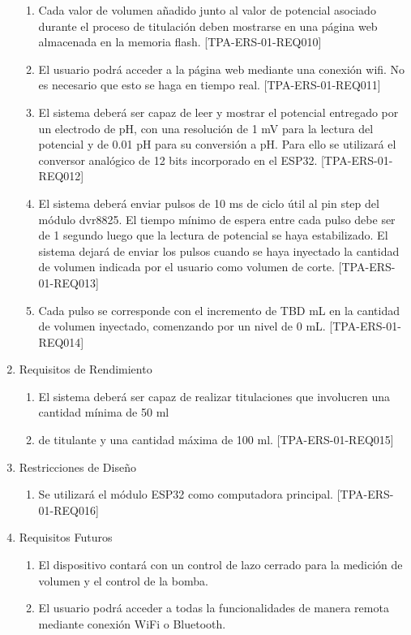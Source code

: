 \documentclass[11pt]{charter}
\begin{document}
\begin{enumerate}
\begin{enumerate}
	\item Cada valor de volumen añadido junto al valor de potencial asociado durante el proceso de titulación deben mostrarse en una página web almacenada en la memoria flash. [TPA-ERS-01-REQ010]
	\item El usuario podrá acceder a la página web mediante una conexión wifi. No es necesario que esto se haga en tiempo real. [TPA-ERS-01-REQ011]
	\item El sistema deberá ser capaz de leer y mostrar el potencial entregado por un electrodo de pH, con una resolución de 1 mV para la lectura del potencial y de 0.01 pH para su conversión a pH. Para ello se utilizará el conversor analógico de 12 bits incorporado en el ESP32. [TPA-ERS-01-REQ012]
	\item El sistema deberá enviar pulsos de 10 ms de ciclo útil al pin step del módulo dvr8825. El tiempo mínimo de espera entre cada pulso debe ser de 1 segundo luego que la lectura de potencial se haya estabilizado. El sistema dejará de enviar los pulsos cuando se haya inyectado la cantidad de volumen indicada por el usuario como volumen de corte. [TPA-ERS-01-REQ013]
	\item Cada pulso se corresponde con el incremento de TBD mL en la cantidad de volumen inyectado, comenzando por un nivel de 0 mL. [TPA-ERS-01-REQ014]

\end{enumerate}

\item Requisitos de Rendimiento
	\begin{enumerate}
	\item El sistema deberá ser capaz de realizar titulaciones que involucren una cantidad mínima de 50 ml 	\item de titulante y una cantidad máxima de 100 ml. [TPA-ERS-01-REQ015]
	\end{enumerate}
	
\item Restricciones de Diseño
	\begin{enumerate}
	\item Se utilizará el módulo ESP32 como computadora principal. [TPA-ERS-01-REQ016]
	\end{enumerate}
	
\item Requisitos Futuros
	\begin{enumerate}
	\item El dispositivo contará con un control de lazo cerrado para la medición de volumen y el control de la bomba.
	\item El usuario podrá acceder a todas la funcionalidades de manera remota mediante conexión WiFi o Bluetooth.
	\end{enumerate}
\end{enumerate}
\end{document}
